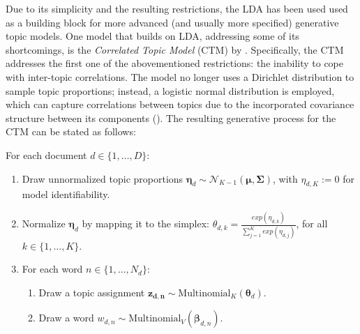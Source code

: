 \noindent
Due to its simplicity and the resulting restrictions, the LDA has been used used as a building block for more advanced (and usually more specified) generative topic models. One model that builds on LDA, addressing some of its shortcomings, is the \textit{Correlated Topic Model} (CTM) by \cite{blei2007correlated}. Specifically, the CTM addresses the first one of the abovementioned restrictions: the inability to cope with inter-topic correlations. The model no longer uses a Dirichlet distribution to sample topic proportions; instead, a logistic normal distribution is employed, which can capture correlations between topics due to the incorporated covariance structure between its components (\citealp{atchison1980logistic}). The resulting generative process for the CTM can be stated as follows:

\vspace{0.25cm}
\noindent
For each document $d \in \{1,\dots,D\}$:

\begin{enumerate}[{1)}]
\vspace{-0.25cm}
\item Draw unnormalized topic proportions $\boldsymbol{\eta}_d \sim \mathcal{N}_{K-1}(\boldsymbol{\mu}, \boldsymbol{\Sigma})$, with $\eta_{d,K} := 0$ for model identifiability.
\vspace{-0.25cm}
\item Normalize $\boldsymbol{\eta}_d$ by mapping it to the simplex: $\theta_{d,k} = \frac{exp(\eta_{d,k})}{\sum_{j=1}^{K}exp(\eta_{d,j})}$, for all $k \in \{1,\dots,K\}$.
\vspace{-0.25cm}
\item For each word $n \in \{1,\dots,N_d\}$:
	\begin{enumerate}[{a)}]
	\vspace{-0.25cm}    
    \item Draw a topic assignment $\boldsymbol{z_{d,n}} \sim \text{Multinomial}_K(\boldsymbol{\theta}_d)$.
	\vspace{-0.25cm}    
    \item Draw a word $w_{d,n} \sim \text{Multinomial}_V(\boldsymbol{\beta}_{d,n})$.
	\end{enumerate}
\end{enumerate}


